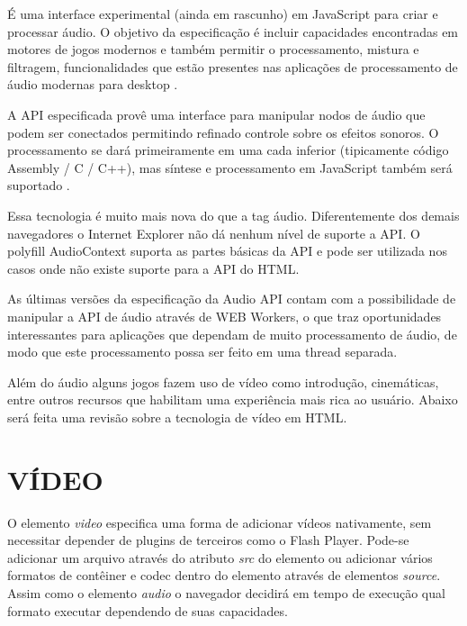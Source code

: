 É uma interface experimental (ainda em rascunho) em JavaScript para
criar e processar áudio. O objetivo da especificação é incluir
capacidades encontradas em motores de jogos modernos e também permitir
o processamento, mistura e filtragem, funcionalidades que estão
presentes nas aplicações de processamento de áudio modernas para
desktop \autocite{audioApiSpec}.

A API especificada provê uma interface para manipular nodos de
áudio que podem ser conectados permitindo refinado controle sobre os
efeitos sonoros. O processamento se dará primeiramente em uma cada
inferior (tipicamente código Assembly / C / C++), mas síntese e
processamento em JavaScript também será suportado \autocite{audioApiSpec}.

Essa tecnologia é muito mais nova do que a tag áudio. Diferentemente
dos demais navegadores o Internet Explorer não dá nenhum
nível de suporte a API. O polyfill AudioContext  suporta as partes
básicas da API e pode ser utilizada nos casos onde não existe suporte
para a API do HTML.

As últimas versões da especificação da Audio API contam com a
possibilidade de manipular a API de áudio através de WEB Workers, o
que traz oportunidades interessantes para aplicações que dependam de
muito processamento de áudio, de modo que este processamento possa ser
feito em uma thread separada.

Além do áudio alguns jogos fazem uso de vídeo como introdução, cinemáticas,
entre outros recursos que habilitam uma experiência mais rica ao usuário.
Abaixo será feita uma revisão sobre a tecnologia de vídeo em HTML.
\section{VÍDEO}

O elemento \textit{video} especifica uma forma de adicionar vídeos nativamente,
sem necessitar depender de plugins de terceiros como o Flash Player.
Pode-se adicionar um arquivo através do atributo \textit{src} do elemento
ou adicionar vários formatos de contêiner e codec dentro do elemento através
de elementos \textit{source}. Assim como o elemento \textit{audio} o navegador
decidirá em tempo de execução qual formato executar dependendo de suas capacidades.

